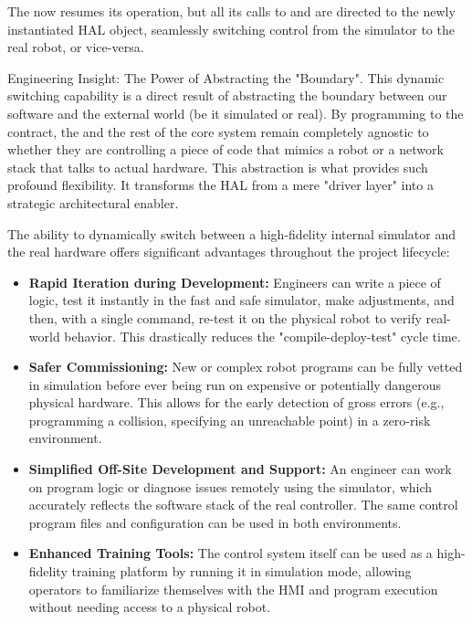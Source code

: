 The  now resumes its operation, but all its calls to  and  are directed to the newly instantiated HAL object, seamlessly switching control from the simulator to the real robot, or vice-versa.

\begin{principlebox}{Engineering Insight: The Power of Abstracting the "Boundary".}
    This dynamic switching capability is a direct result of abstracting the boundary between our software and the external world (be it simulated or real). By programming to the  contract, the  and the rest of the core system remain completely agnostic to whether they are controlling a piece of code that mimics a robot or a network stack that talks to actual hardware. This abstraction is what provides such profound flexibility. It transforms the HAL from a mere "driver layer" into a strategic architectural enabler.
\end{principlebox}



The ability to dynamically switch between a high-fidelity internal simulator and the real hardware offers significant advantages throughout the project lifecycle:
\begin{itemize}
    \item \textbf{Rapid Iteration during Development:} Engineers can write a piece of logic, test it instantly in the fast and safe simulator, make adjustments, and then, with a single command, re-test it on the physical robot to verify real-world behavior. This drastically reduces the "compile-deploy-test" cycle time.
    \item \textbf{Safer Commissioning:} New or complex robot programs can be fully vetted in simulation before ever being run on expensive or potentially dangerous physical hardware. This allows for the early detection of gross errors (e.g., programming a collision, specifying an unreachable point) in a zero-risk environment.
    \item \textbf{Simplified Off-Site Development and Support:} An engineer can work on program logic or diagnose issues remotely using the simulator, which accurately reflects the software stack of the real controller. The same control program files and configuration can be used in both environments.
    \item \textbf{Enhanced Training Tools:} The control system itself can be used as a high-fidelity training platform by running it in simulation mode, allowing operators to familiarize themselves with the HMI and program execution without needing access to a physical robot.
\end{itemize}

